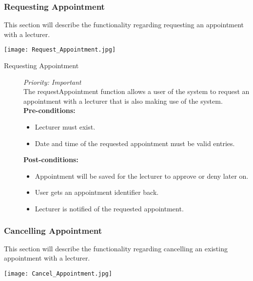 \subsubsection{Requesting Appointment}

This section will describe the functionality regarding  requesting an appointment with a lecturer.

\texttt{[image: Request\_Appointment.jpg]}

\begin{description}

\item[Requesting Appointment]\hfill \textit{Priority: Important} \\
The requestAppointment function allows a user of the system to request an appointment with a lecturer that is also making use of the system. \\
\textbf{Pre-conditions:} 
	\begin{itemize}
		\item Lecturer must exist.
		\item Date and time of the requested appointment must be valid entries.
	\end{itemize}
\textbf{Post-conditions:} 
	\begin{itemize}
		\item Appointment will be saved for the lecturer to approve or deny later on.
		\item User gets an appointment identifier back.
		\item Lecturer is notified of the requested appointment. 
	\end{itemize}
\end{description}

\subsubsection{Cancelling Appointment}

This section will describe the functionality regarding  cancelling an existing appointment with a lecturer.

\texttt{[image: Cancel\_Appointment.jpg]}

